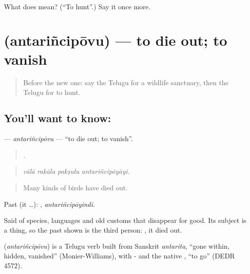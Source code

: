 \begin{tcolorbox}[breakable,colback=teal!4,colframe=teal!35!black,title={Before you move on}]
What does  mean? (\textquotedblleft{}To hunt\textquotedblright{}.) Say it once more.
\end{tcolorbox}
\section[\texorpdfstring{\te{అంతరించిపోవు} (antariñcipōvu)}{అంతరించిపోవు (antariñcipōvu)}]{ (antariñcipōvu) — to die out; to vanish}

\label{lesson:TE-C472-antarincipovu}



\begin{quote}
Before the new one: say the Telugu for a wildlife sanctuary, then the Telugu for to hunt.
\end{quote}

\subsection*{You'll want to know: }
\textbf{} — \emph{antariñcipōvu} — \textquotedblleft{}to die out; to vanish\textquotedblright{}.

\begin{quote}
   .
\end{quote}

\begin{quote}
\emph{cālā rakāla pakṣulu antariñcipōyāyi.}
\end{quote}

\begin{quote}
Many kinds of birds have died out.
\end{quote}

Past (it …): , \emph{antariñcipōyindi}.

Said of species, languages and old customs that disappear for good. Its subject is a thing, so the past shown is the third person: , it died out.

\begin{cousinweb}
\textbf{} (\emph{antariñcipōvu}) is a Telugu verb built from Sanskrit \emph{antarita}, \textquotedblleft{}gone within, hidden, vanished\textquotedblright{} (Monier-Williams), with - and the native , \textquotedblleft{}to go\textquotedblright{} (DEDR 4572).
\end{cousinweb}

